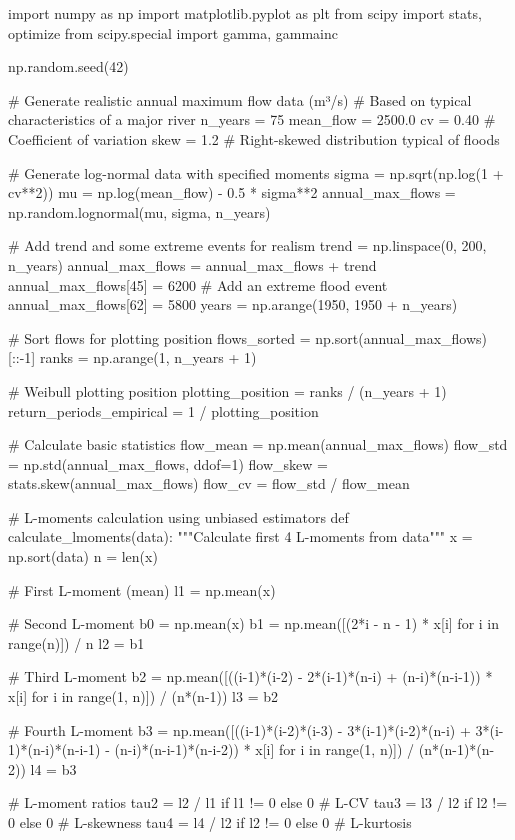 \documentclass[a4paper, 11pt]{article}
\begin{document}
\begin{pycode}
import numpy as np
import matplotlib.pyplot as plt
from scipy import stats, optimize
from scipy.special import gamma, gammainc

np.random.seed(42)

# Generate realistic annual maximum flow data (m³/s)
# Based on typical characteristics of a major river
n_years = 75
mean_flow = 2500.0
cv = 0.40  # Coefficient of variation
skew = 1.2  # Right-skewed distribution typical of floods

# Generate log-normal data with specified moments
sigma = np.sqrt(np.log(1 + cv**2))
mu = np.log(mean_flow) - 0.5 * sigma**2
annual_max_flows = np.random.lognormal(mu, sigma, n_years)

# Add trend and some extreme events for realism
trend = np.linspace(0, 200, n_years)
annual_max_flows = annual_max_flows + trend
annual_max_flows[45] = 6200  # Add an extreme flood event
annual_max_flows[62] = 5800
years = np.arange(1950, 1950 + n_years)

# Sort flows for plotting position
flows_sorted = np.sort(annual_max_flows)[::-1]
ranks = np.arange(1, n_years + 1)

# Weibull plotting position
plotting_position = ranks / (n_years + 1)
return_periods_empirical = 1 / plotting_position

# Calculate basic statistics
flow_mean = np.mean(annual_max_flows)
flow_std = np.std(annual_max_flows, ddof=1)
flow_skew = stats.skew(annual_max_flows)
flow_cv = flow_std / flow_mean

# L-moments calculation using unbiased estimators
def calculate_lmoments(data):
    """Calculate first 4 L-moments from data"""
    x = np.sort(data)
    n = len(x)

    # First L-moment (mean)
    l1 = np.mean(x)

    # Second L-moment
    b0 = np.mean(x)
    b1 = np.mean([(2*i - n - 1) * x[i] for i in range(n)]) / n
    l2 = b1

    # Third L-moment
    b2 = np.mean([((i-1)*(i-2) - 2*(i-1)*(n-i) + (n-i)*(n-i-1)) * x[i]
                  for i in range(1, n)]) / (n*(n-1))
    l3 = b2

    # Fourth L-moment
    b3 = np.mean([((i-1)*(i-2)*(i-3) - 3*(i-1)*(i-2)*(n-i) +
                   3*(i-1)*(n-i)*(n-i-1) - (n-i)*(n-i-1)*(n-i-2)) * x[i]
                  for i in range(1, n)]) / (n*(n-1)*(n-2))
    l4 = b3

    # L-moment ratios
    tau2 = l2 / l1 if l1 != 0 else 0  # L-CV
    tau3 = l3 / l2 if l2 != 0 else 0  # L-skewness
    tau4 = l4 / l2 if l2 != 0 else 0  # L-kurtosis


\end{pycode}
\end{document}
